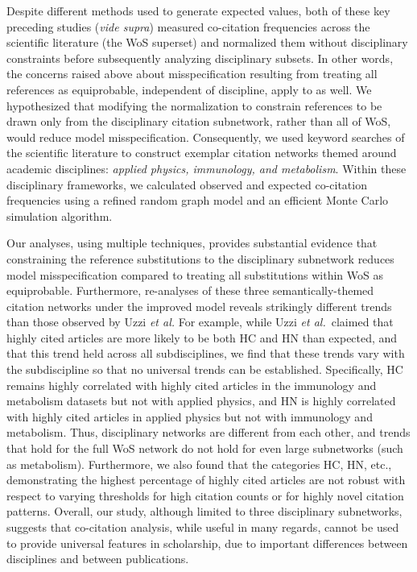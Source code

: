 \documentclass[NETN]{stjour}
\begin{document}
Despite different methods used to generate expected values, both of these key preceding studies (\emph{vide supra}) measured co-citation frequencies across the scientific literature (the WoS superset) and normalized them without disciplinary constraints before subsequently analyzing disciplinary subsets.
In other words, the concerns raised above about misspecification resulting from treating
all references as equiprobable, independent of discipline, apply to \cite{boyack_vs_uzzi_2014} as well.
 We hypothesized that modifying the normalization to constrain references to be drawn only from the disciplinary citation subnetwork,   rather than all of WoS, would reduce model misspecification.  Consequently, we used keyword searches of the scientific literature to construct exemplar citation networks themed around academic disciplines: \emph{applied physics, immunology, and metabolism}. Within these disciplinary frameworks, we calculated observed and expected co-citation frequencies using a refined random graph model and an efficient Monte Carlo simulation algorithm. 

Our analyses, using multiple techniques, provides substantial evidence that constraining the reference substitutions to the disciplinary subnetwork reduces model misspecification compared to treating all substitutions within WoS as equiprobable. 
Furthermore, re-analyses of these three semantically-themed
 citation networks  under the improved model reveals strikingly different trends than those 
 observed by Uzzi {\em et al.} 
 For example, while Uzzi {\em et al.}~claimed that highly cited articles are more likely to be both HC and HN than expected, and that this trend held across all subdisciplines, we find that these trends vary with the subdiscipline so that no universal trends can be established. Specifically, 
 HC remains highly correlated with highly cited articles in the immunology and metabolism datasets but not with applied physics, and HN is highly correlated with highly cited articles in applied physics but not with immunology and metabolism.    
 Thus, disciplinary networks are different from each other, and trends that hold for the full WoS network do not hold for even large subnetworks (such as metabolism). 
 Furthermore, we also found that the categories HC, HN, etc.,  demonstrating the highest percentage of highly cited articles are not robust with respect to varying thresholds for high citation counts or for highly novel citation patterns.
 Overall, our study, although limited to three disciplinary subnetworks, suggests that  co-citation analysis, while useful in many regards, cannot be used to provide universal features in scholarship, due to important differences between disciplines and between publications.
\end{document}

